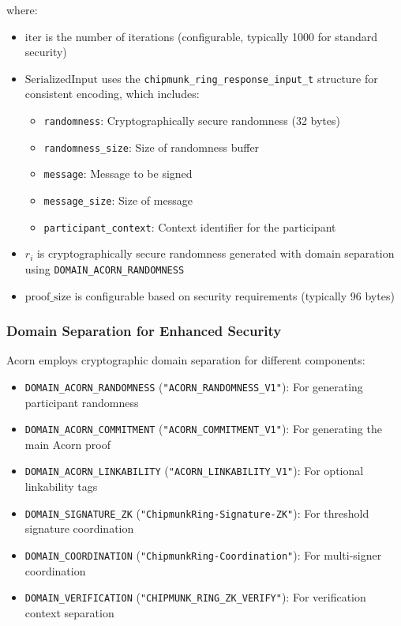\documentclass[11pt,a4paper]{article}
\begin{document}
where:
\begin{itemize}
\item $\text{iter}$ is the number of iterations (configurable, typically 1000 for standard security)
\item $\text{SerializedInput}$ uses the \texttt{chipmunk\_ring\_response\_input\_t} structure for consistent encoding, which includes:
  \begin{itemize}
  \item \texttt{randomness}: Cryptographically secure randomness (32 bytes)
  \item \texttt{randomness\_size}: Size of randomness buffer
  \item \texttt{message}: Message to be signed
  \item \texttt{message\_size}: Size of message
  \item \texttt{participant\_context}: Context identifier for the participant
  \end{itemize}
\item $r_i$ is cryptographically secure randomness generated with domain separation using \texttt{DOMAIN\_ACORN\_RANDOMNESS}
\item $\text{proof\_size}$ is configurable based on security requirements (typically 96 bytes)
\end{itemize}

\subsubsection{Domain Separation for Enhanced Security}

Acorn employs cryptographic domain separation for different components:
\begin{itemize}
\item \texttt{DOMAIN\_ACORN\_RANDOMNESS} (\texttt{"ACORN\_RANDOMNESS\_V1"}): For generating participant randomness
\item \texttt{DOMAIN\_ACORN\_COMMITMENT} (\texttt{"ACORN\_COMMITMENT\_V1"}): For generating the main Acorn proof
\item \texttt{DOMAIN\_ACORN\_LINKABILITY} (\texttt{"ACORN\_LINKABILITY\_V1"}): For optional linkability tags
\item \texttt{DOMAIN\_SIGNATURE\_ZK} (\texttt{"ChipmunkRing-Signature-ZK"}): For threshold signature coordination
\item \texttt{DOMAIN\_COORDINATION} (\texttt{"ChipmunkRing-Coordination"}): For multi-signer coordination
\item \texttt{DOMAIN\_VERIFICATION} (\texttt{"CHIPMUNK\_RING\_ZK\_VERIFY"}): For verification context separation
\end{itemize}
\end{document}
